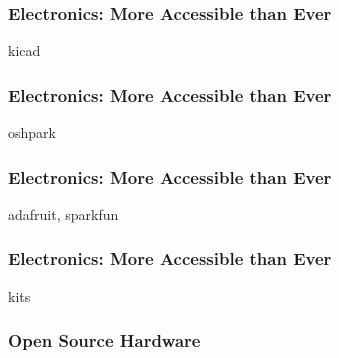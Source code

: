 \documentclass{presentation}
\begin{document}
\begin{frame}\frametitle{Electronics: More Accessible than Ever}
  kicad
\end{frame}

\begin{frame}\frametitle{Electronics: More Accessible than Ever}
  oshpark
\end{frame}

\begin{frame}\frametitle{Electronics: More Accessible than Ever}
  adafruit, sparkfun
\end{frame}

\begin{frame}\frametitle{Electronics: More Accessible than Ever}
  kits
\end{frame}

\begin{frame}\frametitle{Open Source Hardware}
\end{frame}
\end{document}

